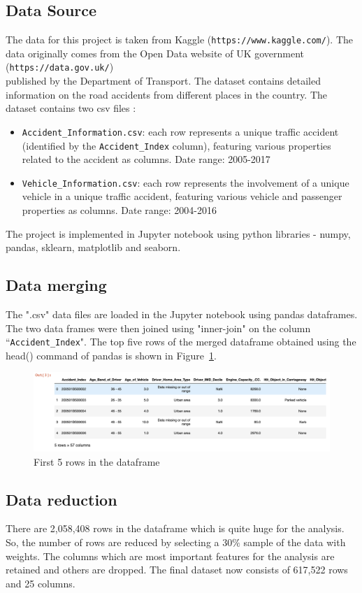 \documentclass[12pt]{article}
\begin{document}
\subsection{Data Source}
The data for this project is taken from Kaggle (\verb|https://www.kaggle.com/|).
The data originally comes from the Open Data website of UK government (\verb|https://data.gov.uk/|)\\
published by the Department of Transport. The dataset contains detailed information on the road accidents from different places in the country. The dataset contains two  csv files :
\begin{itemize}
\item  \verb|Accident_Information.csv|: each row represents a unique traffic accident (identified by the \verb|Accident_Index| column), featuring various properties related to the accident as columns. Date range: 2005-2017
\item  \verb|Vehicle_Information.csv|: each row represents the involvement of a unique vehicle in a unique traffic accident, featuring various vehicle and passenger properties as columns. Date range: 2004-2016
\end{itemize}
The project is implemented in Jupyter notebook using python libraries - numpy, pandas, sklearn, matplotlib and seaborn.
\subsection{Data merging}
The ".csv" data files are loaded in the Jupyter notebook using pandas dataframes. The two data frames were then joined using "inner-join" on the column ``\verb|Accident_Index|". The top five rows of the merged dataframe obtained using the head() command of pandas is shown in Figure~\ref{fig1}.
\begin{figure}[h!]
\centering
\includegraphics[width=0.9\linewidth]{"./figs/fig1"}
\caption{First 5 rows in the dataframe}
\label{fig1}
\end{figure}
\subsection{Data reduction}
There are 2,058,408 rows in the dataframe which is quite huge for the analysis. So, the number of rows are reduced by selecting a 30$\%$ sample of the data with weights.  The columns which are most important features for the analysis are retained and others are dropped. The final dataset now consists of 617,522 rows and 25 columns.
\end{document}

